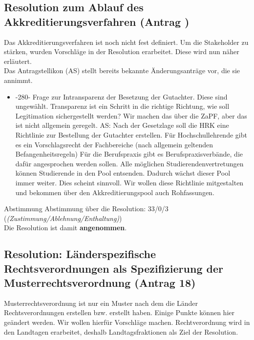   \subsection{Resolution zum Ablauf des Akkreditierungsverfahren (Antrag )}
    Das Akkreditierungsverfahren ist noch nicht fest definiert. Um die Stakeholder zu stärken, wurden Vorschläge in der Resolution erarbeitet. Diese wird nun näher erläutert. \\
    Das Antragstellikon (AS) stellt bereits bekannte Änderungsanträge vor, die sie annimmt.

    \begin{itemize}
      \item -280- Frage zur Intransparenz der Besetzung der Gutachter. Diese sind ungewählt. Transparenz ist ein Schritt in die richtige Richtung, wie soll Legitimation sichergestellt werden? Wir machen das über die ZaPF, aber das ist nicht allgemein geregelt.
      AS: Nach der Gesetzlage soll die HRK eine Richtlinie zur Bestellung der Gutachter erstellen. Für Hochschullehrende gibt es ein Vorschlagsrecht der Fachbereiche (nach allgemein geltenden Befangenheitsregeln)
      Für die Berufspraxis gibt es Berufspraxisverbände, die dafür angesprochen werden sollen.
      Alle möglichen Studierendenvertretungen können Studierende in den Pool entsenden. Dadurch wächst dieser Pool immer weiter. Dies scheint sinnvoll.
      Wir wollen diese Richtlinie mitgestalten und bekommen über den Akkreditierungspool auch Rohfassungen.
    \end{itemize}

    \begin{success}{Abstimmung}
      Abstimmung über die Resolution: 33/0/3 (\textit{(Zustimmung/Ablehnung/Enthaltung)}) \\
      Die Resolution ist damit \textbf{angenommen}.
    \end{success}

  \subsection{Resolution: Länderspezifische Rechtsverordnungen als Spezifizierung der Musterrechtsverordnung (Antrag 18)}
    Musterrechtsverordnung ist nur ein Muster nach dem die Länder Rechtsverordnungen erstellen bzw. erstellt haben. Einige Punkte können hier geändert werden. Wir wollen hierfür Vorschläge machen.
    Rechtverordnung wird in den Landtagen erarbeitet, deshalb Landtagsfraktionen als Ziel der Resolution. \\

